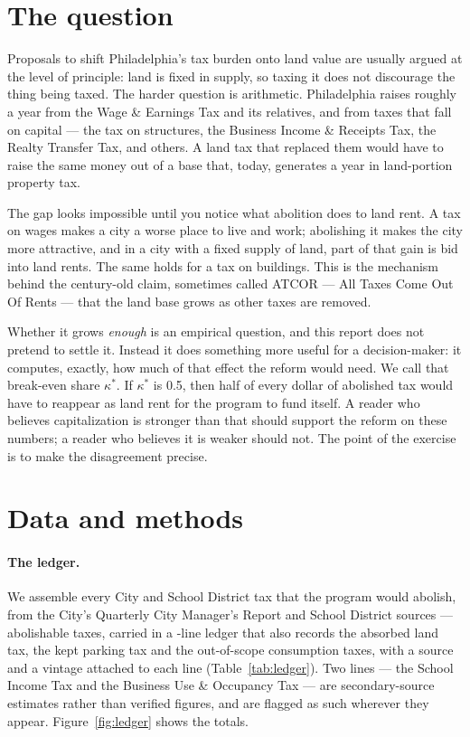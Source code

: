 \documentclass[11pt]{article}
\begin{document}
\section{The question}

Proposals to shift Philadelphia's tax burden onto land value are usually argued at the level
of principle: land is fixed in supply, so taxing it does not discourage the thing being taxed.
The harder question is arithmetic. Philadelphia raises roughly \StxLaborB{} a year from the
Wage \& Earnings Tax and its relatives, and \StxCapitalB{} from taxes that fall on capital ---
the tax on structures, the Business Income \& Receipts Tax, the Realty Transfer Tax, and
others. A land tax that replaced them would have to raise the same money out of a base that,
today, generates \StxLandTaxB{} a year in land-portion property tax.

The gap looks impossible until you notice what abolition does to land rent. A tax on wages
makes a city a worse place to live and work; abolishing it makes the city more attractive, and
in a city with a fixed supply of land, part of that gain is bid into land rents. The same
holds for a tax on buildings. This is the mechanism behind the century-old claim, sometimes
called ATCOR --- All Taxes Come Out Of Rents --- that the land base grows as other taxes are
removed.

Whether it grows \emph{enough} is an empirical question, and this report does not pretend to
settle it. Instead it does something more useful for a decision-maker: it computes, exactly,
how much of that effect the reform would need. We call that break-even share $\kappa^*$. If
$\kappa^*$ is 0.5, then half of every dollar of abolished tax would have to reappear as land %
rent for the program to fund itself. A reader who believes capitalization is stronger than
that should support the reform on these numbers; a reader who believes it is weaker should
not. The point of the exercise is to make the disagreement precise.

\section{Data and methods}

\paragraph{The ledger.} We assemble every City and School District tax that the program would
abolish, from the City's Quarterly City Manager's Report and School District sources ---
\StxAbolishableLines{} abolishable taxes, carried in a \StxLedgerLines{}-line ledger that also
records the absorbed land tax, the kept parking tax and the out-of-scope consumption taxes,
with a source and a vintage attached to each line
(Table~\ref{tab:ledger}). Two lines --- the School Income Tax and the Business Use \&
Occupancy Tax --- are secondary-source estimates rather than verified figures, and are flagged
as such wherever they appear. Figure~\ref{fig:ledger} shows the totals.
\end{document}
